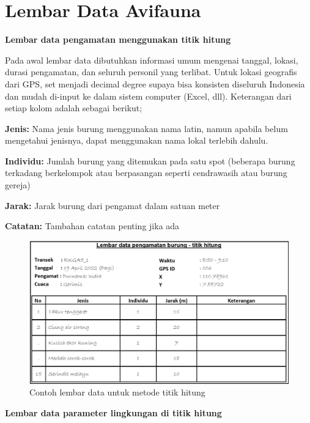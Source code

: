 \documentclass[
]{book}
\begin{document}
\hypertarget{lembar-data-avifauna}{%
\section*{Lembar Data Avifauna}\label{lembar-data-avifauna}}

\textbf{Lembar data pengamatan menggunakan titik hitung}

Pada awal lembar data dibutuhkan informasi umum mengenai tanggal, lokasi, durasi pengamatan, dan seluruh personil yang terlibat. Untuk lokasi geografis dari GPS, set menjadi decimal degree supaya bisa konsisten diseluruh Indonesia dan mudah di-input ke dalam sistem computer (Excel, dll). Keterangan dari setiap kolom adalah sebagai berikut;

\textbf{Jenis:} Nama jenis burung menggunakan nama latin, namun apabila belum mengetahui jenisnya, dapat menggunakan nama lokal terlebih dahulu.

\textbf{Individu:} Jumlah burung yang ditemukan pada satu spot (beberapa burung terkadang berkelompok atau berpasangan seperti cendrawasih atau burung gereja)

\textbf{Jarak:} Jarak burung dari pengamat dalam satuan meter

\textbf{Catatan:} Tambahan catatan penting jika ada

\begin{figure}

{\centering \includegraphics[width=1\linewidth]{images/ldp_th} 

}

\caption{Contoh lembar data untuk metode titik hitung}\label{fig:ldpth}
\end{figure}

\textbf{Lembar data parameter lingkungan di titik hitung}
\end{document}
